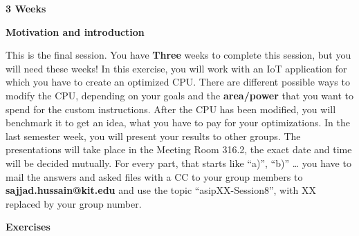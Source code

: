 \documentclass[
]{article}
\begin{document}
\textbf{{3 Weeks}}

\textbf{Motivation and introduction}

This is the final session. You have \textbf{{Three}} weeks to complete
this session, but you will need these weeks! In this exercise, you will
work with an IoT application for which you have to create an optimized
CPU. There are different possible ways to modify the CPU, depending on
your goals and the \textbf{{area/power}} that you want to spend for the
custom instructions. After the CPU has been modified, you will benchmark
it to get an idea, what you have to pay for your optimizations. In the
last semester week, you will present your results to other groups. The
presentations will take place in the Meeting Room 316.2, the exact date
and time will be decided mutually. For every part, that starts like
``a)'', ``b)'' \ldots{} you have to mail the answers and asked files
with a CC to your group members to \textbf{sajjad.hussain@kit.edu} and
use the topic ``asipXX-Session8'', with XX replaced by your group
number.

\textbf{Exercises}
\end{document}

